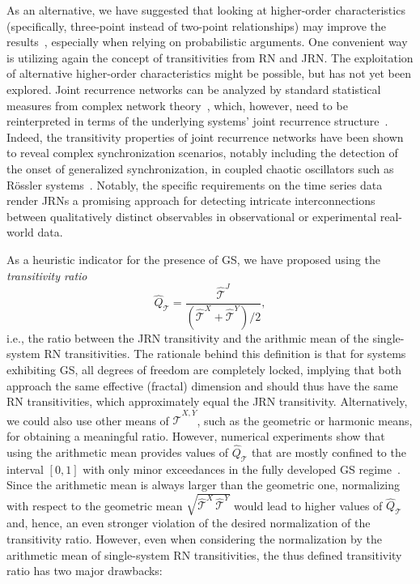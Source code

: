 As an alternative, we have suggested that looking at higher-order characteristics (specifically, three-point instead of two-point relationships) may improve the results~\cite{Feldhoff2013}, especially when relying on probabilistic arguments. 
One convenient way is utilizing again the concept of transitivities from RN and JRN. The exploitation of alternative higher-order characteristics might be possible, but has not yet been explored. Joint recurrence networks can be analyzed by standard statistical measures from complex network theory~\cite{Newman2003,Donner2010b}, which, however, need to be reinterpreted in terms of the underlying systems' joint recurrence structure~\cite{Feldhoff2011,Feldhoff2012,Donner2012}. Indeed, the transitivity properties of joint recurrence networks have been shown to reveal complex synchronization scenarios, notably including the detection of the onset of generalized synchronization, in coupled chaotic oscillators such as R\"ossler systems~\cite{Feldhoff2012}. Notably, the specific requirements on the time series data render JRNs a promising approach for detecting intricate interconnections between qualitatively distinct observables in observational or experimental real-world data. 

As a heuristic indicator for the presence of GS, we have proposed using the \emph{transitivity ratio}~\cite{Feldhoff2013} 
\begin{equation}
\hat{Q}_{\mathcal{T}}=\frac{\hat{\mathcal{T}}^J}{(\hat{\mathcal{T}}^X+\hat{\mathcal{T}}^Y)/2}, 
\label{eq:qt}
\end{equation}
\noindent
i.e., the ratio between the JRN transitivity and the arithmic mean of the single-system RN transitivities. The rationale behind this definition is that for systems exhibiting GS, all degrees of freedom are completely locked, implying that both approach the same effective (fractal) dimension and should thus have the same RN transitivities, which approximately equal the JRN transitivity. Alternatively, we could also use other means of $\hat{\mathcal{T}}^{X,Y}$, such as the geometric or harmonic means, for obtaining a meaningful ratio. However, numerical experiments show that using the arithmetic mean provides values of $\hat{Q}_{\mathcal{T}}$ that are mostly confined to the interval $[0,1]$ with only minor exceedances in the fully developed GS regime~\cite{Feldhoff2013}. Since the arithmetic mean is always larger than the geometric one, normalizing with respect to the geometric mean $\sqrt{\hat{\mathcal{T}}^X\, \hat{\mathcal{T}}^Y}$ would lead to higher values of $\hat{Q}_{\mathcal{T}}$ and, hence, an even stronger violation of the desired normalization of the transitivity ratio. However, even when considering the normalization by the arithmetic mean of single-system RN transitivities, the thus defined transitivity ratio has two major drawbacks: 

